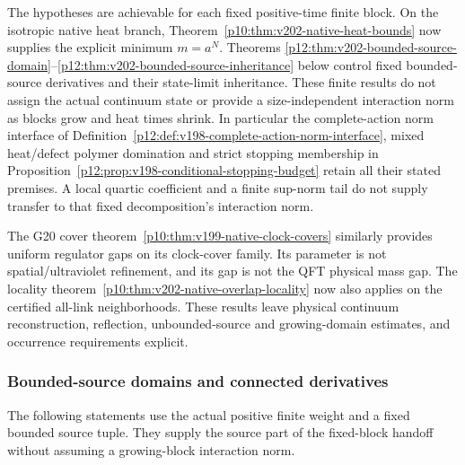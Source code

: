 \documentclass[12pt,a4paper]{article}
\begin{document}
The hypotheses are achievable for each fixed positive-time finite block.
On the isotropic native heat branch, Theorem~\ref{p10:thm:v202-native-heat-bounds}
now supplies the explicit minimum $m=a^N$. Theorems
\ref{p12:thm:v202-bounded-source-domain}--\ref{p12:thm:v202-bounded-source-inheritance}
below control fixed bounded-source derivatives and their state-limit
inheritance. These finite results do not assign the actual continuum state
or provide a size-independent interaction norm as blocks grow and heat times shrink.
In particular the complete-action norm interface of
Definition~\ref{p12:def:v198-complete-action-norm-interface}, mixed
heat/defect polymer domination and strict stopping membership in
Proposition~\ref{p12:prop:v198-conditional-stopping-budget} retain all their
stated premises.  A local quartic coefficient and a finite sup-norm tail do
not supply transfer to that fixed decomposition's interaction norm.

The G20 cover theorem~\ref{p10:thm:v199-native-clock-covers} similarly
provides uniform regulator gaps on its clock-cover family.  Its parameter
is not spatial/ultraviolet refinement, and its gap is not the QFT physical
mass gap.  The locality theorem~\ref{p10:thm:v202-native-overlap-locality}
now also applies on the certified all-link neighborhoods. These results
leave physical continuum reconstruction, reflection, unbounded-source
and growing-domain estimates, and occurrence requirements explicit.


\subsubsection{Bounded-source domains and connected derivatives}
\label{p12:sec:v202-bounded-sources}
The following statements use the actual positive finite weight and a
fixed bounded source tuple. They supply the source part of the fixed-block
handoff without assuming a growing-block interaction norm.
\end{document}
